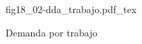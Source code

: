 \begin{figure}[h]
\centering
\def\svgwidth{0.5\textwidth}
{fig18_02-dda_trabajo.pdf_tex}
\caption{Demanda por trabajo}
\label{fig18_02-dda_trabajo}
\end{figure}